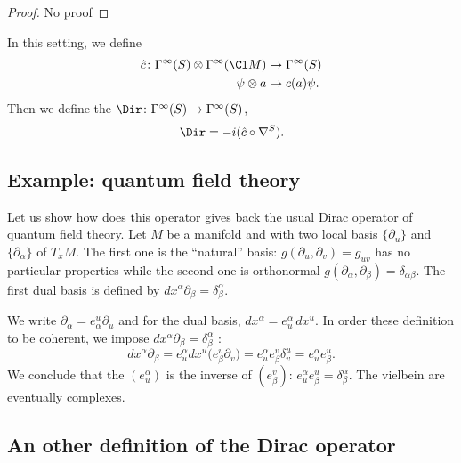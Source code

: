 \begin{proof}
No proof
\end{proof}


In this setting, we define 
\begin{equation}
\begin{aligned}
 \hat c\colon\Gamma^{\infty}(S)\otimes\Gamma^{\infty}(\Cl M)&\to \Gamma^{\infty}(S) \\ 
 \psi\otimes a&\mapsto c(a)\psi. 
\end{aligned}
\end{equation}
Then we define the  $\Dir\colon \Gamma^{\infty}(S)\to \Gamma^{\infty}(S)$,
\begin{equation}
  \Dir=-i(\hat c\circ\nabla^S).
\end{equation}

\subsection{Example: quantum field theory}

Let us show how does this operator gives back the usual Dirac operator of quantum field theory. Let $M$ be a manifold and with two local basis $\{ \partial_u \}$ and $\{ \partial_{\alpha} \}$ of $T_xM$. The first one is the ``natural'' basis: $g(\partial_u,\partial_v)=g_{uv}$ has no particular properties while the second one is orthonormal $g(\partial_{\alpha},\partial_{\beta})=\delta_{\alpha\beta}$. The first dual basis is defined by $dx^{\alpha}\partial_{\beta}=\delta^{\alpha}_{\beta}$. 

We write $\partial_{\alpha}=e_{\alpha}^u\partial_u$ and for the dual basis, $dx^{\alpha}=e^{\alpha}_u\,dx^u$. In order these definition to be coherent, we impose $dx^{\alpha}\partial_{\beta}=\delta^{\alpha}_{\beta}$ :
\begin{equation}
  dx^{\alpha}\partial_{\beta}=e_u^{\alpha}dx^u\big( e^v_{\beta}\partial_v \big)
		=e^{\alpha}_ue^v_{\beta}\delta^u_v
		=e^{\alpha}_ue^u_{\beta}.
\end{equation}
We conclude that the  $(e^{\alpha}_u)$ is the inverse of $(e^v_{\beta})$: $e^{\alpha}_ue^u_{\beta}=\delta^{\alpha}_{\beta}$. The vielbein are eventually complexes.



\subsection{An other definition of the Dirac operator}

